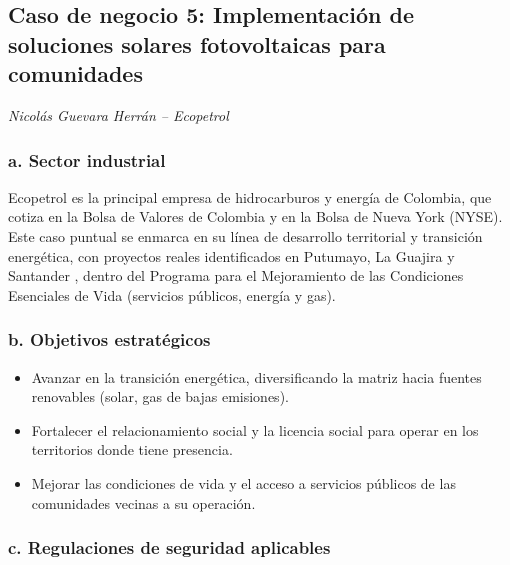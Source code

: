 \subsection{Caso de negocio 5: Implementación de soluciones solares fotovoltaicas para comunidades}

\textit{Nicolás Guevara Herrán -- Ecopetrol}

\subsubsection*{a. Sector industrial}

Ecopetrol es la principal empresa de hidrocarburos y energía de Colombia, que cotiza en la Bolsa de Valores de Colombia y en la Bolsa de Nueva York (NYSE). Este caso puntual se enmarca en su línea de desarrollo territorial y transición energética, con proyectos reales identificados en Putumayo, La Guajira y Santander \parencite{larepublica2026,vanguardia2025}, dentro del Programa para el Mejoramiento de las Condiciones Esenciales de Vida (servicios públicos, energía y gas).

\subsubsection*{b. Objetivos estratégicos}

\begin{itemize}
	\item Avanzar en la transición energética, diversificando la matriz hacia fuentes renovables (solar, gas de bajas emisiones).
	\item Fortalecer el relacionamiento social y la licencia social para operar en los territorios donde tiene presencia.
	\item Mejorar las condiciones de vida y el acceso a servicios públicos de las comunidades vecinas a su operación.
\end{itemize}

\subsubsection*{c. Regulaciones de seguridad aplicables}

